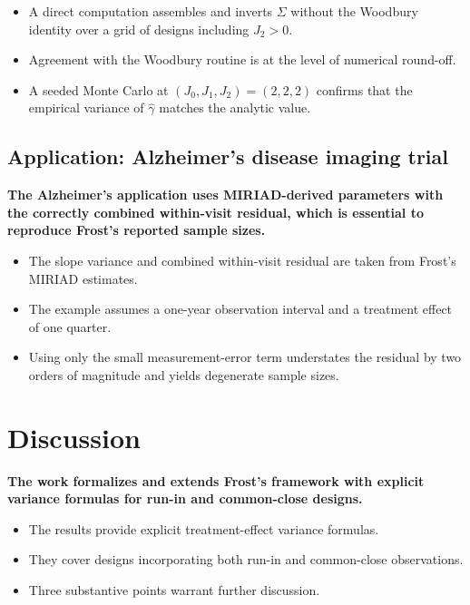 \documentclass[
  11pt,
]{article}
\begin{document}
\begin{itemize}\setlength{\itemsep}{2pt}\setlength{\parskip}{0pt}
\item A direct computation assembles and inverts $\Sigma$ without the Woodbury identity over a grid of designs including $J_2 > 0$.
\item Agreement with the Woodbury routine is at the level of numerical round-off.
\item A seeded Monte Carlo at $(J_0, J_1, J_2) = (2, 2, 2)$ confirms that the empirical variance of $\hat\gamma$ matches the analytic value.
\end{itemize}

\subsection{Application: Alzheimer's disease imaging trial}\label{application-alzheimers-disease-imaging-trial}

\textbf{The Alzheimer's application uses MIRIAD-derived parameters with the correctly combined within-visit residual, which is essential to reproduce Frost's reported sample sizes.}

\begin{itemize}\setlength{\itemsep}{2pt}\setlength{\parskip}{0pt}
\item The slope variance and combined within-visit residual are taken from Frost's MIRIAD estimates.
\item The example assumes a one-year observation interval and a treatment effect of one quarter.
\item Using only the small measurement-error term understates the residual by two orders of magnitude and yields degenerate sample sizes.
\end{itemize}

\section{Discussion}\label{discussion}

\textbf{The work formalizes and extends Frost's framework with explicit variance formulas for run-in and common-close designs.}

\begin{itemize}\setlength{\itemsep}{2pt}\setlength{\parskip}{0pt}
\item The results provide explicit treatment-effect variance formulas.
\item They cover designs incorporating both run-in and common-close observations.
\item Three substantive points warrant further discussion.
\end{itemize}
\end{document}
